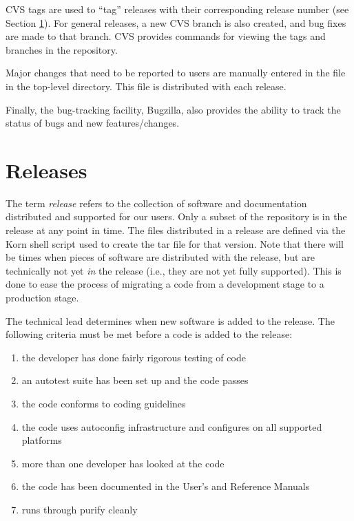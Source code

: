 CVS tags are used to ``tag'' releases with their corresponding release
number (see Section \ref{Releases}).  For general releases, a new CVS
branch is also created, and bug fixes are made to that branch.  CVS
provides commands for viewing the tags and branches in the repository.

Major changes that need to be reported to users are manually entered
in the  file in the top-level directory.  This file is
distributed with each \hypre{} release.

Finally, the \hypre{} bug-tracking facility, Bugzilla, also provides
the ability to track the status of bugs and new features/changes.


\section{Releases}
\label{Releases}

The term \hypre{} {\em release} refers to the collection of software
and documentation distributed and supported for our users.  Only a
subset of the repository is in the \hypre{} release at any point in
time.  The files distributed in a release are defined via the Korn
shell script  used to create the tar file for that
version.  Note that there will be times when pieces of software are 
distributed with the release, but are technically not yet {\em in} 
the release (i.e., they are not yet fully supported).  This is done 
to ease the process of migrating a code from a development stage to 
a production stage.

The \hypre{} technical lead determines when new software is added to
the release.  The following criteria must be met before a code is
added to the release:
\begin{enumerate}

\item the developer has done fairly rigorous testing of code
\item an autotest suite has been set up and the code passes
\item the code conforms to coding guidelines
\item the code uses autoconfig infrastructure and configures on all
supported platforms
\item more than one developer has looked at the code
\item the code has been documented in the User's and Reference Manuals
\item runs through purify cleanly

\end{enumerate}

